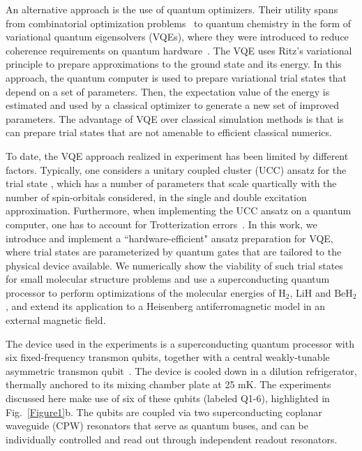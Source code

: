 \documentclass[twocolumn]{revtex4-1}
\newcommand{\1}{\mathbbm{1}}
\newcommand{\emp}[1]{{\color{blue} #1}}
\begin{document}
An alternative approach is the use of quantum optimizers. Their utility spans from combinatorial optimization problems~\cite{farhi2014quantum,Farhi2017} to quantum chemistry in the form of variational quantum eigensolvers (VQEs), where they were introduced to reduce coherence requirements on quantum hardware~\cite{Peruzzo13,yung2013transistor,mcclean2016theory}. The VQE uses Ritz's variational principle to prepare approximations to the ground state and its energy. In this approach, the quantum computer is used to prepare variational trial states that depend on a set of parameters. Then, the expectation value of the energy is estimated and used by a classical optimizer to generate a new set of improved parameters. The advantage of VQE over classical simulation
methods is that is can prepare trial states that are not amenable to efficient classical numerics.

To date, the VQE approach realized in experiment has been limited by different factors. Typically, one considers a unitary coupled cluster (UCC) ansatz for the trial state \emp{\cite{OMalley16,Shen17}}, which has a number of parameters that scale quartically with the number of spin-orbitals considered, in the single and double excitation approximation. Furthermore, when implementing the UCC ansatz on a quantum computer, one has to account for Trotterization errors~\cite{mcclean2016theory,Wecker2015,Romero2017}. In this work, we introduce and implement a ``hardware-efficient" ansatz preparation for VQE, where trial states are parameterized by quantum gates that are tailored to the physical device available. We numerically show the viability of such trial states for small molecular structure problems and use a superconducting quantum processor to perform optimizations of the molecular energies of $\textrm{H}_2$, $\textrm{LiH}$ and $\textrm{BeH}_2$, and extend its application to a Heisenberg antiferromagnetic model in an external magnetic field.


The device used in the experiments is a superconducting quantum processor with six fixed-frequency transmon qubits, together with a central weakly-tunable asymmetric transmon qubit~\cite{hutchings2017tunable}. The device is cooled down in a dilution refrigerator, thermally anchored to its mixing chamber plate at 25 mK. The experiments discussed here make use of six of these qubits (labeled Q1-6), highlighted in Fig.~\ref{Figure1}b. The qubits are coupled via two superconducting coplanar waveguide (CPW) resonators that serve as quantum buses, and can be individually controlled and read out through independent readout resonators. 
\end{document}
